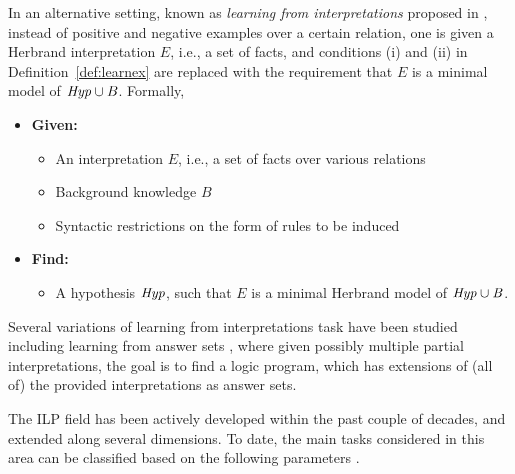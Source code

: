 In an alternative setting, known as \emph{learning from interpretations} proposed in \cite{DBLP:journals/ai/RaedtD94}, instead of positive and negative examples over a certain relation, one is given a Herbrand interpretation $E$, i.e., a set of facts, and conditions (i) and (ii) in Definition~\ref{def:learnex} are replaced with the requirement that $E$ is a minimal model of $\mathit{Hyp} \cup B$.
Formally, 
\begin{definition}\label{def:learnint}
\begin{itemize}
\item[] \textbf{Given:}
\begin{itemize}
\item An interpretation $E$, i.e., a set of facts over various relations
\item Background knowledge $B$
\item Syntactic restrictions on the form of rules to be induced
\end{itemize}
\smallskip

\item[] \textbf{Find:}
\begin{itemize}
\item A hypothesis $\mathit{Hyp}$, such that $E$ is a minimal Herbrand model of $\mathit{Hyp \cup B}$.
\end{itemize}
\end{itemize}
\end{definition}

Several variations of learning from interpretations task have been studied including learning from answer sets \cite{DBLP:journals/tocl/Sakama05,DBLP:journals/ai/LawRB18}, where given possibly multiple partial interpretations, the goal is to find a logic program, which has extensions of (all of) the provided interpretations as answer sets.

The ILP field has been actively developed within the past couple of decades, and extended along several dimensions.
To date, the main tasks considered in this area can be classified based on the following parameters \cite{DBLP:conf/semweb/SazonauS17,Boytcheva2007OverviewOI}.






